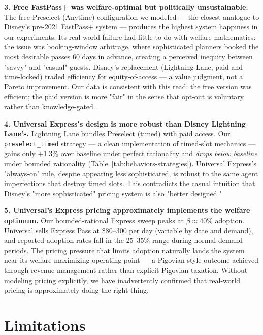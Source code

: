 \documentclass[11pt]{article}
\begin{document}
\textbf{3. Free FastPass+ was welfare-optimal but politically unsustainable.} The free Preselect (Anytime) configuration we modeled --- the closest analogue to Disney's pre-2021 FastPass+ system --- produces the highest system happiness in our experiments. Its real-world failure had little to do with welfare mathematics: the issue was booking-window arbitrage, where sophisticated planners booked the most desirable passes 60 days in advance, creating a perceived inequity between "savvy" and "casual" guests. Disney's replacement (Lightning Lane, paid and time-locked) traded efficiency for equity-of-access --- a value judgment, not a Pareto improvement. Our data is consistent with this read: the free version was efficient; the paid version is more "fair" in the sense that opt-out is voluntary rather than knowledge-gated.

\textbf{4. Universal Express's design is more robust than Disney Lightning Lane's.} Lightning Lane bundles Preselect (timed) with paid access. Our \texttt{preselect\_timed} strategy --- a clean implementation of timed-slot mechanics --- gains only +1.3\% over baseline under perfect rationality and \emph{drops below baseline} under bounded rationality (Table~\ref{tab:behaviors-strategies}). Universal Express's "always-on" rule, despite appearing less sophisticated, is robust to the same agent imperfections that destroy timed slots. This contradicts the casual intuition that Disney's "more sophisticated" pricing system is also "better designed."

\textbf{5. Universal's Express pricing approximately implements the welfare optimum.} Our bounded-rational Express sweep peaks at $\beta \approx 40\%$ adoption. Universal sells Express Pass at \$80--300 per day (variable by date and demand), and reported adoption rates fall in the 25--35\% range during normal-demand periods. The pricing pressure that limits adoption naturally lands the system near its welfare-maximizing operating point --- a Pigovian-style outcome achieved through revenue management rather than explicit Pigovian taxation. Without modeling pricing explicitly, we have inadvertently confirmed that real-world pricing is approximately doing the right thing.

\section{Limitations}
\end{document}
